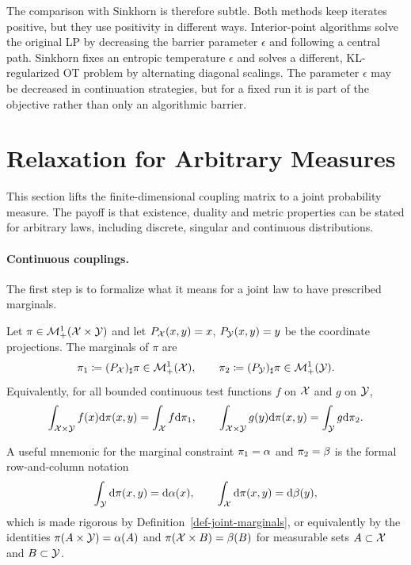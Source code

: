The comparison with Sinkhorn is therefore subtle. Both methods keep iterates positive, but they use positivity in different ways. Interior-point algorithms solve the original LP by decreasing the barrier parameter $\epsilon$ and following a central path. Sinkhorn fixes an entropic temperature $\epsilon$ and solves a different, KL-regularized OT problem by alternating diagonal scalings. The parameter $\epsilon$ may be decreased in continuation strategies, but for a fixed run it is part of the objective rather than only an algorithmic barrier.

\section{Relaxation for Arbitrary Measures}
\label{sec-kantorovich-continuous}

This section lifts the finite-dimensional coupling matrix to a joint probability measure. The payoff is that existence, duality and metric properties can be stated for arbitrary laws, including discrete, singular and continuous distributions.

\paragraph{Continuous couplings.}

The first step is to formalize what it means for a joint law to have prescribed marginals.

\begin{defn}\label{def-joint-marginals}
	Let $\pi\in\mathcal{M}_+^1(\mathcal{X}\times\mathcal{Y})$ and let $P_{\mathcal{X}}(x,y)=x$, $P_{\mathcal{Y}}(x,y)=y$ be the coordinate projections. The marginals of $\pi$ are
	\[
		\pi_1\coloneqq(P_{\mathcal{X}})_\sharp\pi\in\mathcal{M}_+^1(\mathcal{X}),
		\qquad
		\pi_2\coloneqq(P_{\mathcal{Y}})_\sharp\pi\in\mathcal{M}_+^1(\mathcal{Y}).
	\]
	Equivalently, for all bounded continuous test functions $f$ on $\mathcal{X}$ and $g$ on $\mathcal{Y}$,
	\[
		\int_{\mathcal{X}\times\mathcal{Y}} f(x)\mathrm{d}\pi(x,y)=\int_{\mathcal{X}} f\mathrm{d}\pi_1,
		\qquad
		\int_{\mathcal{X}\times\mathcal{Y}} g(y)\mathrm{d}\pi(x,y)=\int_{\mathcal{Y}} g\mathrm{d}\pi_2.
	\]
\end{defn}

A useful mnemonic for the marginal constraint $\pi_1=\alpha$ and $\pi_2=\beta$ is the formal row-and-column notation
\[
	\int_{\mathcal{Y}} \mathrm{d}\pi(x,y)=\mathrm{d}\alpha(x),
	\qquad
	\int_{\mathcal{X}} \mathrm{d}\pi(x,y)=\mathrm{d}\beta(y),
\]
which is made rigorous by Definition~\ref{def-joint-marginals}, or equivalently by the identities $\pi(A\times\mathcal{Y})=\alpha(A)$ and $\pi(\mathcal{X}\times B)=\beta(B)$ for measurable sets $A\subset\mathcal{X}$ and $B\subset\mathcal{Y}$.

